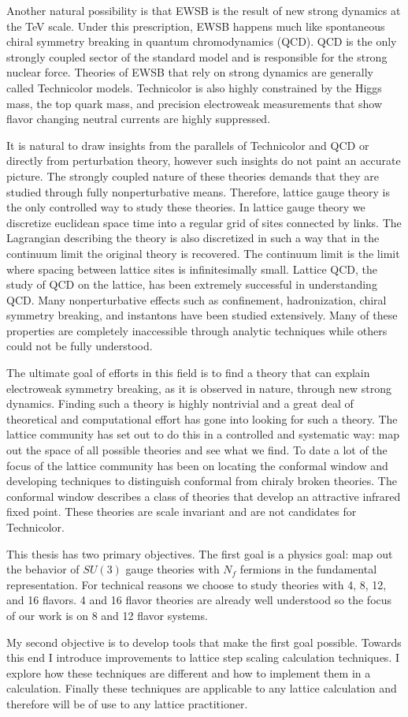 Another natural possibility is that EWSB is the result of new strong dynamics at the TeV scale.
Under this prescription, EWSB happens much like spontaneous chiral symmetry breaking in quantum chromodynamics (QCD).
QCD is the only strongly coupled sector of the standard model and is responsible for the strong nuclear force.
Theories of EWSB that rely on strong dynamics are generally called Technicolor models.
Technicolor is also highly constrained by the Higgs mass, the top quark mass, and precision electroweak measurements that show flavor changing neutral currents are highly suppressed.

It is natural to draw insights from the parallels of Technicolor and QCD or directly from perturbation theory, however such insights do not paint an accurate picture.
The strongly coupled nature of these theories demands that they are studied through fully nonperturbative means.
Therefore, lattice gauge theory is the only controlled way to study these theories.
In lattice gauge theory we discretize euclidean space time into a regular grid of sites connected by links.
The Lagrangian describing the theory is also discretized in such a way that in the continuum limit the original theory is recovered.
The continuum limit is the limit where spacing between lattice sites is infinitesimally small.
Lattice QCD, the study of QCD on the lattice, has been extremely successful in understanding QCD.
Many nonperturbative effects such as confinement, hadronization, chiral symmetry breaking, and instantons have been studied extensively.
Many of these properties are completely inaccessible through analytic techniques while others could not be fully understood.

The ultimate goal of efforts in this field is to find a theory that can explain electroweak symmetry breaking, as it is observed in nature, through new strong dynamics.
Finding such a theory is highly nontrivial and a great deal of theoretical and computational effort has gone into looking for such a theory.
The lattice community has set out to do this in a controlled and systematic way: map out the space of all possible theories and see what we find.
To date a lot of the focus of the lattice community has been on locating the conformal window and developing techniques to distinguish conformal from chiraly broken theories.
The conformal window describes a class of theories that develop an attractive infrared fixed point.
These theories are scale invariant and are not candidates for Technicolor.

This thesis has two primary objectives.
The first goal is a physics goal:  map out the behavior of $SU(3)$ gauge theories with $N_f$ fermions in the fundamental representation.
For technical reasons we choose to study theories with 4, 8, 12, and 16 flavors.
4 and 16 flavor theories are already well understood so the focus of our work is on 8 and 12 flavor systems.

My second objective is to develop tools that make the first goal possible.
Towards this end I introduce improvements to lattice step scaling calculation techniques.
I explore how these techniques are different and how to implement them in a calculation.
Finally these techniques are applicable to any lattice calculation and therefore will be of use to any lattice practitioner.
